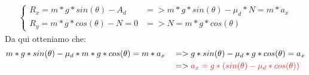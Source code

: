 \begin{itemize}
                    \begin{align*}
                        \begin{cases}
                            R_x = m*g*sin(\theta)-A_{d} &=> m*g*sin(\theta)-\mu_d * N= m*a_x \\
                            R_y = m*g*cos(\theta)-N = 0 &=> N = m*g*cos(\theta)
                        \end{cases}
                    \end{align*}
                    Da qui otteniamo che:
                    \begin{align*}
                        &m*g*sin(\theta)-\mu_d*m*g*cos(\theta) = m*a_x&&=>g*sin(\theta)-\mu_d*g*cos(\theta) = a_x\\
                        & && => \textcolor{Red}{a_x = g*(sin(\theta)-\mu_d*cos(\theta))}
                    \end{align*}
                \end{itemize}

